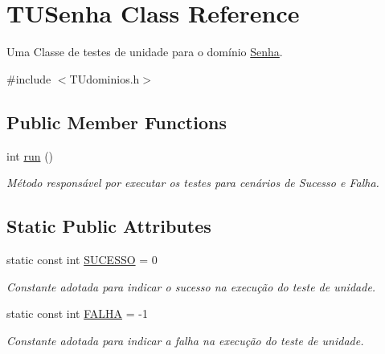 \hypertarget{classTUSenha}{}\section{T\+U\+Senha Class Reference}
\label{classTUSenha}


Uma Classe de testes de unidade para o domínio \hyperlink{classSenha}{Senha}.  




{\ttfamily \#include $<$T\+Udominios.\+h$>$}

\subsection*{Public Member Functions}
\begin{DoxyCompactItemize}
\item 
int \hyperlink{classTUSenha_ac5ddea52ed42b828961f343b82074125}{run} ()
\begin{DoxyCompactList}\small\item\em Método responsável por executar os testes para cenários de Sucesso e Falha. \end{DoxyCompactList}\end{DoxyCompactItemize}
\subsection*{Static Public Attributes}
\begin{DoxyCompactItemize}
\item 
\mbox{\label{classTUSenha_a1a1dabe034b25a899150c95acbc0684c}} 
static const int \hyperlink{classTUSenha_a1a1dabe034b25a899150c95acbc0684c}{S\+U\+C\+E\+S\+SO} = 0
\begin{DoxyCompactList}\small\item\em Constante adotada para indicar o sucesso na execução do teste de unidade. \end{DoxyCompactList}\item 
\mbox{\label{classTUSenha_a71eb0d9005b2d36da6a8530c0dd31842}} 
static const int \hyperlink{classTUSenha_a71eb0d9005b2d36da6a8530c0dd31842}{F\+A\+L\+HA} = -\/1
\begin{DoxyCompactList}\small\item\em Constante adotada para indicar a falha na execução do teste de unidade. \end{DoxyCompactList}\end{DoxyCompactItemize}


